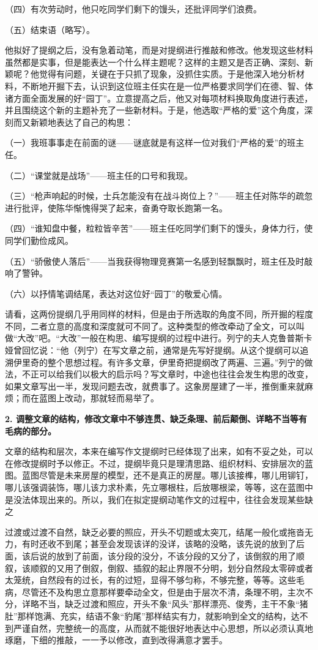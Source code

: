 （四）有次劳动时，他只吃同学们剩下的馒头，还批评同学们浪费。

（五）结束语（略写）。

他拟好了提纲之后，没有急着动笔，而是对提纲进行推敲和修改。他发现这些材料虽然都是实事，但是能表达一个什么样主题呢？这样的主题又是否正确、深刻、新颖呢？他觉得有问题，关键在于只抓了现象，没抓住实质。于是他深入地分析材料，不断地开掘下去，认识到这位班主任实在是一位严格要求同学们在德、智、体诸方面全面发展的好“园丁”。立意提高之后，他又对每项材料换取角度进行表述，并且围绕这个新的主题补充了一些新材料。于是，他选取“严格的爱”这个角度，深刻而又新颖地表达了自己的构思：

（一）我班事事走在前面的谜——谜底就是有这样一位对我们“严格的爱”的班主任。

（二）“课堂就是战场”——班主任的口号和我现。

（三）“枪声响起的时候，士兵怎能没有在战斗岗位上？”——班主任对陈华的疏忽进行批评，使陈华惭愧得哭了起来，奋勇夺取长跑第一名。

（四）“谁知盘中餐，粒粒皆辛苦”——班主任吃同学们剩下的馒头，身体力行，使同学们勤俭成风。

（五）“骄傲使人落后”——当我获得物理竞赛第一名感到轻飘飘时，班主任及时敲响了警钟。

（六）以抒情笔调结尾，表达对这位好“园丁”的敬爱心情。

请看，这两份提纲几乎用同样的材料，但是由于所选取的角度不同，所开掘的程度不同，二者立意的高度和深度就可不同了。这种类型的修改牵动了全文，可以叫做“大改”吧。“大改”一般在构思、编写提纲的过程中进行。列宁的夫人克鲁普斯卡娅曾回忆说：“他（列宁）在写文章之前，通常是先写好提纲。从这个提纲可以追溯伊里奇的整个思想过程。有许多文章，伊里奇把提纲改了两遍、三遍。”列宁的做法，不正可以给我们以极大的启示吗？写文章时，中途也往往会发生构思的改变，如果文章写出一半，发现问题去改，就费事了。这象房屋建了一半，推倒重来就麻烦；而在蓝图上改动，那就轻而易举了。
\newpage

\textbf{2. 调整文章的结构，修改文章中不够连贯、缺乏条理、前后颠倒、详略不当等有毛病的部分。}

文章的结构和层次，本来在编写作文提纲时已经体现了出来，如有不妥之处，可以在修改提纲时予以修正。不过，提纲毕竟只是理清思路、组织材料、安排层次的蓝图。蓝图尽管是未来房屋的模型，还不是真正的房屋。哪儿该接榫，哪儿用铆钉，哪儿该强调装饰，哪儿该力求朴素，先立哪根柱，后放哪根梁，等等，这在蓝图中是没法体现出来的。所以，我们在拟定提纲动笔作文的过程中，往往会发现某些缺之

过渡或过渡不自然，缺乏必要的照应，开头不切题或太突兀，结尾一般化或拖沓无力，有时还收不到尾；甚至会发现该详的没详，该略的没略，该先说的放到了后面，该后说的放到了前面，该分段的没分，不该分段的又分了，该倒叙的用了顺叙，该顺叙的又用了倒叙，倒叙、插叙的起止界限不分明，划分自然段太零碎或者太笼统，自然段有的过长，有的过短，显得不够匀称，不够完整，等等。这些毛病，尽管还不及构思立意那样要牵动全文，但是由于层次不清，条理不明，主次不分，详略不当，缺乏过渡和照应，开头不象“风头”那样漂亮、俊秀，主干不象“猪肚”那样饱满、充实，结语不象“豹尾”那样结实有力，就影响到全文的结构，达不到严谨自然，完整统一的高度，从而就不能很好地表达中心思想，所以必须认真地琢磨，下细的推敲，一一予以修改，直到改得满意才罢手。

